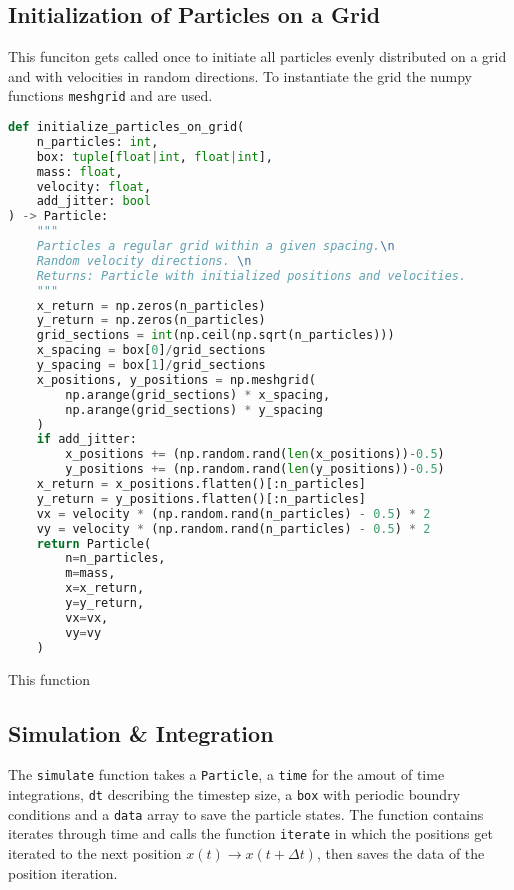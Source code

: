 \documentclass{article}
\begin{document}
\subsection{Initialization of Particles on a Grid}

This funciton gets called once to initiate all particles evenly distributed on a grid and with velocities in random directions. To instantiate the grid the numpy functions \texttt{meshgrid} and  are used. 
\begin{lstlisting}[language=Python, caption=Particle Initialization on a Grid]
def initialize_particles_on_grid(
    n_particles: int, 
    box: tuple[float|int, float|int], 
    mass: float, 
    velocity: float,
    add_jitter: bool
) -> Particle:
    """
    Particles a regular grid within a given spacing.\n
    Random velocity directions. \n
    Returns: Particle with initialized positions and velocities. 
    """
    x_return = np.zeros(n_particles)
    y_return = np.zeros(n_particles)
    grid_sections = int(np.ceil(np.sqrt(n_particles))) 
    x_spacing = box[0]/grid_sections 
    y_spacing = box[1]/grid_sections
    x_positions, y_positions = np.meshgrid(
        np.arange(grid_sections) * x_spacing, 
        np.arange(grid_sections) * y_spacing
    )
    if add_jitter:
        x_positions += (np.random.rand(len(x_positions))-0.5)
        y_positions += (np.random.rand(len(y_positions))-0.5)
    x_return = x_positions.flatten()[:n_particles]
    y_return = y_positions.flatten()[:n_particles]
    vx = velocity * (np.random.rand(n_particles) - 0.5) * 2
    vy = velocity * (np.random.rand(n_particles) - 0.5) * 2
    return Particle(
        n=n_particles,
        m=mass,
        x=x_return,
        y=y_return,
        vx=vx,
        vy=vy
    )
\end{lstlisting}

\noindent
This function 


\subsection{Simulation \& Integration}

The \texttt{simulate} function takes a \texttt{Particle}, a \texttt{time} for the amout of time integrations, \texttt{dt} describing the timestep size, a \texttt{box} with periodic boundry conditions and a \texttt{data} array to save the particle states. The function contains iterates through time and calls the function \texttt{iterate} in which the positions get iterated to the next position $x(t)\rightarrow x(t+\Delta t)$, then saves the data of the position iteration.
\end{document}
